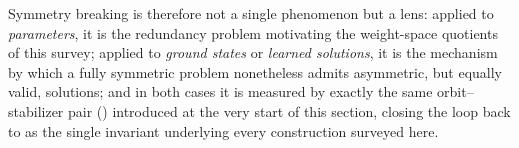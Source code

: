 \documentclass[11pt]{article}
\theoremstyle{plain}
\theoremstyle{definition}
\begin{document}
Symmetry breaking is therefore not a single phenomenon but a lens: applied
to \emph{parameters}, it is the redundancy problem motivating the weight-space
quotients of this survey; applied to \emph{ground states} or \emph{learned
solutions}, it is the mechanism by which a fully symmetric problem
nonetheless admits asymmetric, but equally valid, solutions; and in both
cases it is measured by exactly the same orbit--stabilizer pair
() introduced at the very start of this section, closing the loop back to  as the single invariant underlying every construction surveyed here.





\end{document}
